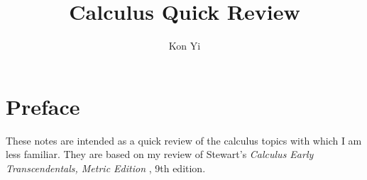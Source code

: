\documentclass[a4paper,oneside]{scrbook}
\author{Kon Yi}
\title{Calculus Quick Review}
\begin{document}
\maketitle

\section*{Preface}

These notes are intended as a quick review of the calculus topics with which I am less familiar. They are based on my review of Stewart's \textit{Calculus Early Transcendentals, Metric Edition }, 9th edition.

\newpage

\tableofcontents

\newpage



\newpage

%

\end{document}
